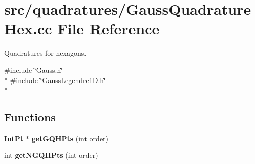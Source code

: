 \section{src/quadratures/\-Gauss\-Quadrature\-Hex.cc File Reference}
\label{GaussQuadratureHex_8cc}


Quadratures for hexagons.  


{\ttfamily \#include \char`\"{}Gauss.\-h\char`\"{}}\\*
{\ttfamily \#include \char`\"{}Gauss\-Legendre1\-D.\-h\char`\"{}}\\*
\subsection*{Functions}
\begin{DoxyCompactItemize}
\item 
{\bf Int\-Pt} $\ast$ {\bfseries get\-G\-Q\-H\-Pts} (int order)\label{GaussQuadratureHex_8cc_a82542ad7c71c9d1960fe736308547dd3}

\item 
int {\bfseries get\-N\-G\-Q\-H\-Pts} (int order)\label{GaussQuadratureHex_8cc_a75833c432cb328b38cbc156566c11b63}

\end{DoxyCompactItemize}
